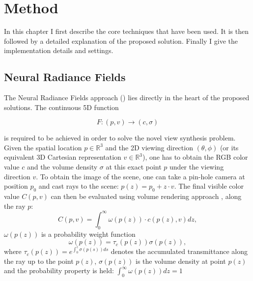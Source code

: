 \chapter{Method}
\label{chap:method}

In this chapter I first describe the core techniques that have been used.
It is then followed by a detailed explanation of the proposed solution.
Finally I give the implementation details and settings.

\section{Neural Radiance Fields}

The Neural Radiance Fields approach (\cite{mildenhall2020nerf}) lies directly in the heart of the proposed solutions.
The continuous 5D function 

\begin{equation}
    \label{eq:nerf_function}
    F : (p,v) \xrightarrow{} (c, \sigma)
\end{equation}

is required to be achieved in order to solve the novel view synthesis problem.
Given the spatial location $p \in \mathbb{R}^3$ and the 2D viewing direction $(\theta, \phi)$ (or its equivalent 3D Cartesian representation $v \in \mathbb{R}^3$),
one has to obtain the RGB color value $c$ and the volume density $\sigma$ at this exact point $p$ under the viewing direction $v$.
To obtain the image of the scene, one can take a pin-hole camera at position $p_0$ and cast rays to the scene: $p(z) = p_0 + z\cdot v$.
The final visible color value $C(p,v)$ can then be evaluated using volume rendering approach \cite{niemeyer2020differentiable}, \cite{Novak18volumeSTAR} along the ray $p$:
\begin{equation}
    C(p,v) = \int_{0}^{\infty} \omega(p(z)) \cdot c(p(z),v) dz,
    \label{eq:rendering_equation}
\end{equation}
$\omega(p(z))$ is a probability weight function
\begin{equation}
    \omega(p(z)) = \tau_c(p(z)) \sigma(p(z)),
\end{equation}
where $\tau_c(p(z)) = e^{\int_0^z \sigma(p(s)) ds}$ denotes the accumulated transmittance along the ray up to the point $p(z)$, $\sigma(p(z))$ is the volume density at point $p(z)$ and the probability property is held: $\int_0^\infty \omega(p(z))dz = 1$

